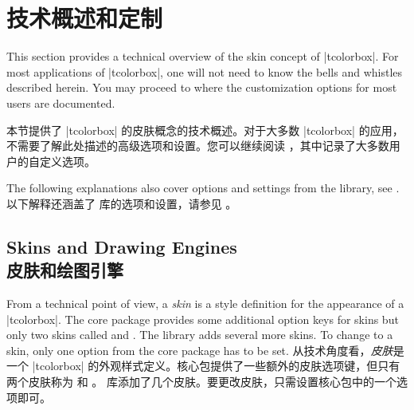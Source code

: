 \section{技术概述和定制}\label{sec:technical}%
%
This section provides a technical overview of the skin concept of |tcolorbox|.
For most applications of |tcolorbox|, one will not need to know the bells and
whistles described herein.
You may proceed to  where the customization options
for most users are documented.


本节提供了 |tcolorbox| 的皮肤概念的技术概述。对于大多数 |tcolorbox| 的应用，不需要了解此处描述的高级选项和设置。您可以继续阅读 ，其中记录了大多数用户的自定义选项。

\begin{stripedbox}
The following explanations also cover options and settings from the  library,
see  .
\tcblower
以下解释还涵盖了  库的选项和设置，请参见 。
\end{stripedbox}

% 
\subsection{Skins and Drawing Engines\\皮肤和绘图引擎}\label{sec:skincorekeys}
\begin{stripedbox}
From a technical point of view, a \emph{skin} is a style definition for the
appearance of a |tcolorbox|. The core package provides some additional
option keys for skins but only two skins called 
and .
The  library adds several more skins. To change to a skin, only one
option from the core package has to be set.
\tcblower
从技术角度看，\emph{皮肤}是一个 |tcolorbox| 的外观样式定义。核心包提供了一些额外的皮肤选项键，但只有两个皮肤称为  和 。  库添加了几个皮肤。要更改皮肤，只需设置核心包中的一个选项即可。
\end{stripedbox}

